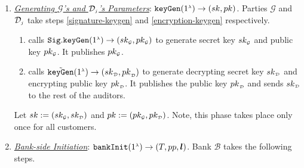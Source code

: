 \vspace{-2.5mm}


\begin{enumerate}[leftmargin=.46cm]

\item \underline{\textit{Generating $\mathcal{G}$'s and  $\mathcal{D}_{\scriptscriptstyle j}$'s  Parameters}}:  $\mathtt{keyGen}(1^{\scriptscriptstyle \lambda})\rightarrow (sk,pk)$. Parties $\mathcal{G}$ and  $\mathcal{D}_{\scriptscriptstyle j}$   take   steps \ref{signature-keygen} and   \ref{encryption-keygen} respectively. 



\begin{enumerate}
\item\label{signature-keygen} calls $\mathtt{Sig.keyGen}(1^{\scriptscriptstyle \lambda})\rightarrow (sk_{\scriptscriptstyle\mathcal{G}}, pk_{\scriptscriptstyle\mathcal{G}})$ to generate   secret key $sk_{\scriptscriptstyle\mathcal{G}}$ and   public key $pk_{\scriptscriptstyle\mathcal{G}}$. It publishes  $pk_{\scriptscriptstyle\mathcal{G}}$.
%
\item\label{encryption-keygen} calls $\tilde{\mathtt{keyGen}}(1^{\scriptscriptstyle\lambda})\rightarrow({sk}_{\scriptscriptstyle\mathcal {D}}, {pk}_{\scriptscriptstyle\mathcal {D}})$ to generate  decrypting secret key ${sk}_{\scriptscriptstyle\mathcal {D}}$ and encrypting public key ${pk}_{\scriptscriptstyle\mathcal {D}}$. It publishes the public key ${pk}_{\scriptscriptstyle\mathcal {D}}$ and sends ${sk}_{\scriptscriptstyle\mathcal {D}}$ to the rest of the auditors.
\end{enumerate}


Let $sk:=(sk_{\scriptscriptstyle\mathcal{G}}, sk_{\scriptscriptstyle\mathcal{D}})$ and $pk:=(pk_{\scriptscriptstyle\mathcal{G}}, pk_{\scriptscriptstyle\mathcal{D}})$. Note, this   phase takes place only once for all customers.

\item\label{RCPoRP::Bank-side-Initiation}  \underline{\textit{Bank-side Initiation}}: $\mathtt{bankInit}(1^{\scriptscriptstyle \lambda})\rightarrow (T, pp, \bm l)$.
%
Bank $\mathcal{B}$ takes the following steps. 
\begin{enumerate}


\end{enumerate}
\end{enumerate}
